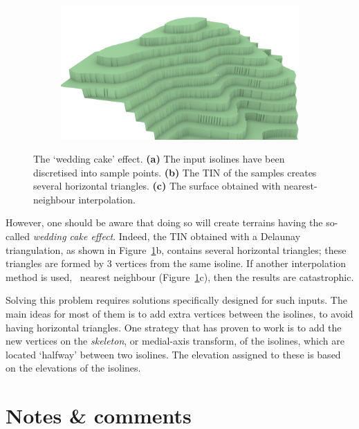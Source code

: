 \begin{figure}
\begin{subfigure}[b]{0.33\linewidth}
    \caption{}
  \end{subfigure}
  \begin{subfigure}[b]{0.33\linewidth}
    \centering
    \includegraphics[width=\textwidth]{figs/wedding-nn.png}
    \caption{}
  \end{subfigure}  
\caption{The `wedding cake' effect. \textbf{(a)} The input isolines have been discretised into sample points. \textbf{(b)} The TIN of the samples creates several horizontal triangles. \textbf{(c)} The surface obtained with nearest-neighbour interpolation.}%
\label{fig:wedding}
\end{figure}
However, one should be aware that doing so will create terrains having the so-called \emph{wedding cake effect}.
Indeed, the TIN obtained with a Delaunay triangulation, as shown in Figure~\ref{fig:wedding}b, contains several horizontal triangles; these triangles are formed by 3 vertices from the same isoline.
If another interpolation method is used, \eg\ nearest neighbour (Figure~\ref{fig:wedding}c), then the results are catastrophic.

%

Solving this problem requires solutions specifically designed for such inputs.
The main ideas for most of them is to add extra vertices between the isolines, to avoid having horizontal triangles. 
One strategy that has proven to work is to add the new vertices on the \emph{skeleton}, or medial-axis transform, of the isolines, which are located `halfway' between two isolines.
The elevation assigned to these is based on the elevations of the isolines.


%
\section{Notes \& comments}

